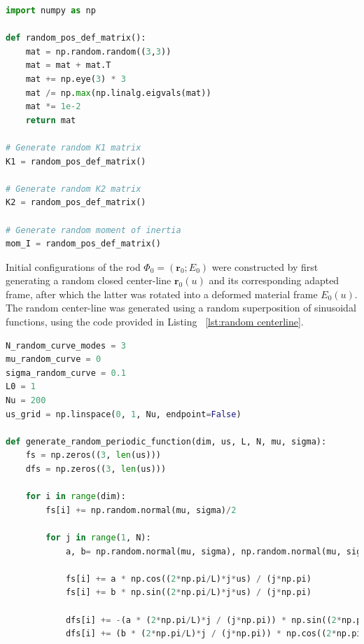 \documentclass[withindex,glossary,techreport]{cam-thesis}
\begin{document}
\begin{appendices}
\lstset{basicstyle=\footnotesize\ttfamily,breaklines=true}
\lstset{framextopmargin=50pt,frame=bottomline}

\begin{lstlisting}[language=Python, caption=Generating random stiffness matrices and moment of inertia., label={lst:random stiffness matrix}]
import numpy as np
    
def random_pos_def_matrix():
    mat = np.random.random((3,3))
    mat = mat + mat.T
    mat += np.eye(3) * 3
    mat /= np.max(np.linalg.eigvals(mat))
    mat *= 1e-2
    return mat
    
# Generate random K1 matrix
K1 = random_pos_def_matrix()

# Generate random K2 matrix
K2 = random_pos_def_matrix()

# Generate random moment of inertia
mom_I = random_pos_def_matrix()
\end{lstlisting}

Initial configurations of the rod $\Phi_0 = (\mathbf{r}_0 ; E_0)$ were constructed by first generating a random closed center-line $\mathbf{r}_0(u)$ and its corresponding adapted frame, after which the latter was rotated into a deformed material frame $E_0(u)$. The random center-line was generated using a random superposition of sinusoidal functions, using the code provided in Listing ~\ref{lst:random centerline}.

\begin{lstlisting}[language=Python, caption=Generating random stiffness matrices and moment of inertia., label={lst:random centerline}]
N_random_curve_modes = 3
mu_random_curve = 0
sigma_random_curve = 0.1
L0 = 1
Nu = 200
us_grid = np.linspace(0, 1, Nu, endpoint=False)

def generate_random_periodic_function(dim, us, L, N, mu, sigma):
    fs = np.zeros((3, len(us)))
    dfs = np.zeros((3, len(us)))
    
    for i in range(dim):
        fs[i] += np.random.normal(mu, sigma)/2
        
        for j in range(1, N):
            a, b= np.random.normal(mu, sigma), np.random.normal(mu, sigma)
            
            fs[i] += a * np.cos((2*np.pi/L)*j*us) / (j*np.pi)
            fs[i] += b * np.sin((2*np.pi/L)*j*us) / (j*np.pi)
            
            dfs[i] += -(a * (2*np.pi/L)*j / (j*np.pi)) * np.sin((2*np.pi/L)*j*us)
            dfs[i] += (b * (2*np.pi/L)*j / (j*np.pi)) * np.cos((2*np.pi/L)*j*us)
            

\end{lstlisting}
\end{appendices}
\end{document}

